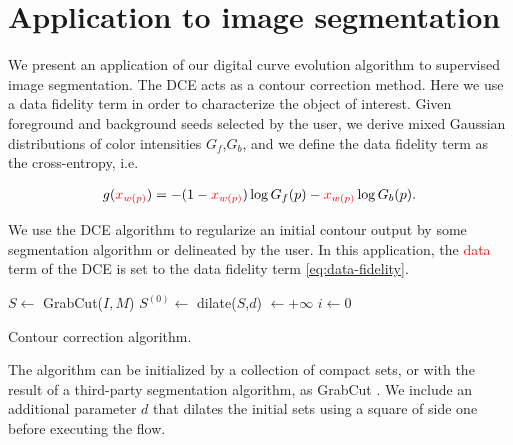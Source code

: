 \documentclass[smallextended]{svjour3}       %
\newcommand{\revision}[1]{\textcolor{red}{#1}}
\begin{document}
{{\section{Application to image segmentation}

We present an application of our digital curve evolution algorithm to supervised image segmentation. The DCE acts as a
contour correction method. Here we use a data fidelity term in order to characterize the object of
interest. Given foreground and background seeds selected by the user, we derive mixed Gaussian distributions of color
intensities $G_f$,$G_b$, and we define the data fidelity term as the cross-entropy, i.e.
	
\begin{align}
  g(\revision{x_{w(p)}}) = -(1-\revision{x_{w(p)}})\log{G_f(p)} - \revision{x_{w(p)}}\log{G_b(p)}.
  \label{eq:data-fidelity}
\end{align}	

We use the DCE algorithm to regularize an initial contour output by some segmentation algorithm or delineated by the user. In this application, the \revision{data} term of the DCE
is set to the data fidelity term \eqref{eq:data-fidelity}.
	
\begin{algorithm}
 
 \BlankLine

 $S \longleftarrow$ GrabCut($I,M$)\;
 $S^{(0)} \longleftarrow $ dilate($S$,$d$)\; 
 \Delta $\longleftarrow +\infty$\;
 $i \longleftarrow 0$\;
 \label{alg:contour-correction} 
 \caption{Contour correction algorithm.}
\end{algorithm}	

The algorithm can be initialized by a collection of compact sets, or with the result of a third-party segmentation algorithm, as GrabCut \cite{rother04grabcut}. We include an additional parameter $d$ that dilates the initial sets using a square of side one before executing the flow.
	
}}
\end{document}
